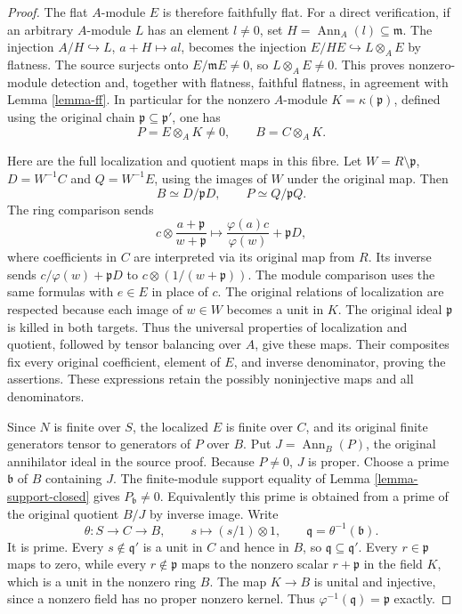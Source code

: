 \begin{proof}
The flat $A$-module $E$ is therefore faithfully
flat. For a direct verification, if an arbitrary
$A$-module $L$ has an element $l\ne0$, set
$H=\operatorname{Ann}_A(l)\subseteq\mathfrak m$.
The injection $A/H\hookrightarrow L$,
$a+H\mapsto al$, becomes the injection
$E/HE\hookrightarrow L\otimes_AE$ by flatness.
The source surjects onto $E/\mathfrak mE\ne0$,
so $L\otimes_AE\ne0$. This proves nonzero-module
detection and, together with flatness, faithful
flatness, in agreement with Lemma \ref{lemma-ff}.
In particular for the nonzero $A$-module
$K=\kappa(\mathfrak p)$, defined using the original
chain $\mathfrak p\subseteq\mathfrak p'$, one has
$$
P=E\otimes_AK\ne0,
\qquad B=C\otimes_AK.
$$

Here are the full localization and quotient maps
in this fibre. Let $W=R\setminus\mathfrak p$,
$D=W^{-1}C$ and $Q=W^{-1}E$, using the images of
$W$ under the original map. Then
$$
B\simeq D/\mathfrak pD,\qquad
P\simeq Q/\mathfrak pQ.
$$
The ring comparison sends
$$
c\otimes\frac{a+\mathfrak p}{w+\mathfrak p}
\longmapsto\frac{\varphi(a)c}{\varphi(w)}+\mathfrak pD,
$$
where coefficients in $C$ are interpreted via its
original map from $R$. Its inverse sends
$c/\varphi(w)+\mathfrak pD$ to
$c\otimes(1/(w+\mathfrak p))$.
The module comparison uses the same formulas
with $e\in E$ in place of $c$. The original
relations of localization are respected because
each image of $w\in W$ becomes a unit in $K$.
The original ideal $\mathfrak p$ is killed in
both targets. Thus the universal properties of
localization and quotient, followed by tensor
balancing over $A$, give these maps. Their
composites fix every original coefficient,
element of $E$, and inverse denominator, proving
the assertions. These expressions retain the
possibly noninjective maps and all denominators.

Since $N$ is finite over $S$, the localized
$E$ is finite over $C$, and its original finite
generators tensor to generators of $P$ over $B$.
Put $J=\operatorname{Ann}_B(P)$, the original
annihilator ideal in the source proof.
Because $P\ne0$, $J$ is proper. Choose a prime
$\mathfrak b$ of $B$ containing $J$.
The finite-module support equality of
Lemma \ref{lemma-support-closed} gives
$P_{\mathfrak b}\ne0$.
Equivalently this prime is obtained from a prime
of the original quotient $B/J$ by inverse image.
Write
$$
\theta:S\longrightarrow C\longrightarrow B,
\qquad s\longmapsto (s/1)\otimes1,
\qquad \mathfrak q=\theta^{-1}(\mathfrak b).
$$
It is prime. Every $s\notin\mathfrak q'$ is a
unit in $C$ and hence in $B$, so
$\mathfrak q\subseteq\mathfrak q'$.
Every $r\in\mathfrak p$ maps to zero, while
every $r\notin\mathfrak p$ maps to the nonzero
scalar $r+\mathfrak p$ in the field $K$, which
is a unit in the nonzero ring $B$. The map
$K\to B$ is unital and injective, since a
nonzero field has no proper nonzero kernel.
Thus
$\varphi^{-1}(\mathfrak q)=\mathfrak p$ exactly.


\end{proof}
